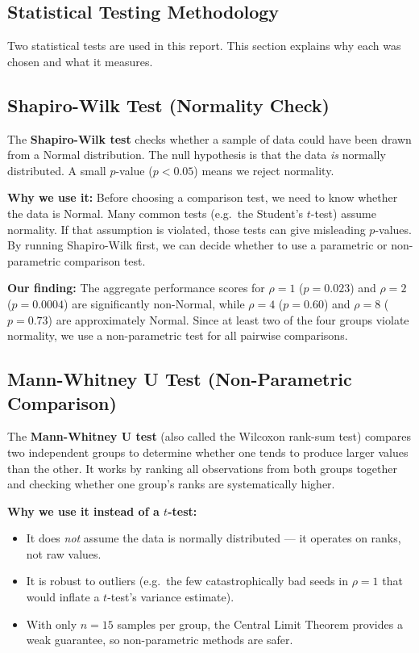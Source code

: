 \documentclass[11pt,a4paper]{article}
\begin{document}
\begin{appendices}
\section{Statistical Testing Methodology}
\label{app:stats}

Two statistical tests are used in this report. This section explains why each was chosen and what it measures.

\subsection*{Shapiro-Wilk Test (Normality Check)}

The \textbf{Shapiro-Wilk test} checks whether a sample of data could have been drawn from a Normal distribution. The null hypothesis is that the data \emph{is} normally distributed. A small \(p\)-value (\(p<0.05\)) means we reject normality.

\textbf{Why we use it:} Before choosing a comparison test, we need to know whether the data is Normal. Many common tests (e.g.\ the Student's \(t\)-test) assume normality. If that assumption is violated, those tests can give misleading \(p\)-values. By running Shapiro-Wilk first, we can decide whether to use a parametric or non-parametric comparison test.

\textbf{Our finding:} The aggregate performance scores for \(\rho=1\) (\(p=0.023\)) and \(\rho=2\) (\(p=0.0004\)) are significantly non-Normal, while \(\rho=4\) (\(p=0.60\)) and \(\rho=8\) (\(p=0.73\)) are approximately Normal. Since at least two of the four groups violate normality, we use a non-parametric test for all pairwise comparisons.

\subsection*{Mann-Whitney U Test (Non-Parametric Comparison)}

The \textbf{Mann-Whitney U test} (also called the Wilcoxon rank-sum test) compares two independent groups to determine whether one tends to produce larger values than the other. It works by ranking all observations from both groups together and checking whether one group's ranks are systematically higher.

\textbf{Why we use it instead of a \(t\)-test:}
\begin{itemize}
    \item It does \emph{not} assume the data is normally distributed — it operates on ranks, not raw values.
    \item It is robust to outliers (e.g.\ the few catastrophically bad seeds in \(\rho=1\) that would inflate a \(t\)-test's variance estimate).
    \item With only \(n=15\) samples per group, the Central Limit Theorem provides a weak guarantee, so non-parametric methods are safer.
\end{itemize}


\end{appendices}
\end{document}
